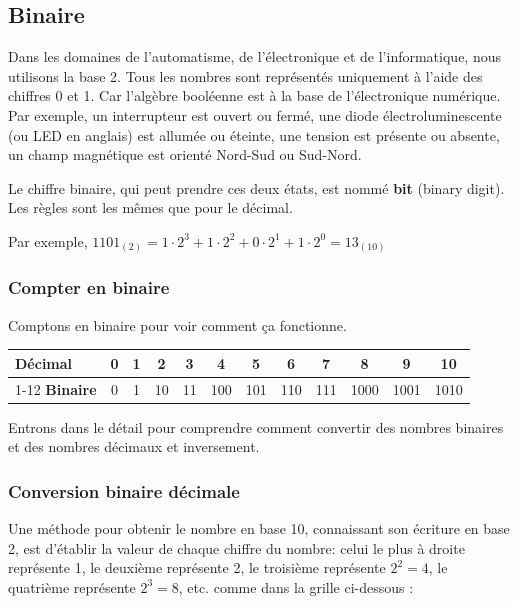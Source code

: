 \documentclass[11pt, a4paper]{book}
\begin{document}
\subsection{Binaire}

Dans les domaines de l'automatisme, de l'électronique et de l'informatique, nous utilisons la base 2. Tous les nombres sont représentés uniquement à l'aide des chiffres 0 et 1.  Car l'algèbre booléenne est à la base de l'électronique numérique. Par exemple, un interrupteur est ouvert ou fermé, une diode électroluminescente (ou LED en anglais) est allumée ou éteinte,  une tension est présente ou absente, un champ magnétique est orienté Nord-Sud ou Sud-Nord.

Le chiffre binaire, qui peut prendre ces deux états, est nommé {\bf bit} (binary digit). Les règles sont les mêmes que pour le décimal. 

Par exemple, $1101_{(2)}=1 \cdot 2^3 + 1 \cdot 2^2 + 0 \cdot 2^1 + 1\cdot 2^0=13_{(10)}$ 

\subsubsection{Compter en binaire}
Comptons en binaire pour voir comment ça fonctionne.

\begin{center}
\renewcommand{\arraystretch}{1.25}
\begin{tabular}{l*{11}{c}}

\textbf{Décimal} & 0 & 1 & 2 & 3 & 4 & 5 & 6 & 7 & 8 & 9 & 10 \\
\cmidrule(lr){1-12}
\rowcolor{gray!10}
\textbf{Binaire} & 0 & 1 & 10 & 11 & 100 & 101 & 110 & 111 & 1000 & 1001 & 1010 \\

\end{tabular}
\end{center}

Entrons dans le détail pour comprendre comment convertir des nombres binaires et des nombres décimaux et inversement.
\subsubsection{Conversion binaire décimale}

Une méthode pour obtenir le nombre en base 10, connaissant son écriture en base 2, est d'établir la valeur de chaque chiffre du nombre: celui le plus à droite représente 1, le deuxième représente 2, le troisième représente $2^2=4$, le quatrième représente $2^3=8$, etc. comme dans la grille ci-dessous :  
\end{document}
